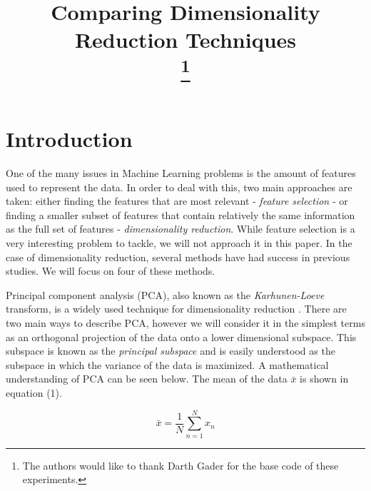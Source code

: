 \documentclass[conference,onecolumn]{IEEEtran}
\begin{document}
\title{Comparing Dimensionality Reduction Techniques\\
\thanks{The authors would like to thank Darth Gader for the base code of these experiments.}
}

\author{
\and
{}
}

\maketitle
\section{Introduction}
One of the many issues in Machine Learning problems is the amount of features used to represent the data. In order to deal with this, two main approaches are taken: either finding the features that are most relevant - \textit{feature selection} - or finding a smaller subset of features that contain relatively the same information as the full set of features - \textit{dimensionality reduction}. While feature selection is a very interesting problem to tackle, we will not approach it in this paper. In the case of dimensionality reduction, several methods have had success in previous studies. We will focus on four of these methods.

Principal component analysis (PCA), also known as the \textit{Karhunen-Loeve} transform, is a widely used technique for dimensionality reduction \cite{Bishop}. There are two main ways to describe PCA, however we will consider it in the simplest terms as an orthogonal projection of the data onto a lower dimensional subspace. This subspace is known as the \textit{principal subspace} and is easily understood as the subspace in which the variance of the data is maximized. A mathematical understanding of PCA can be seen below. The mean of the data $\bar{x}$ is shown in equation (1).

\begin{equation}
\bar{x} = \frac{1}{N}\sum_{n=1}^N x_{n}
\end{equation}
\end{document}
